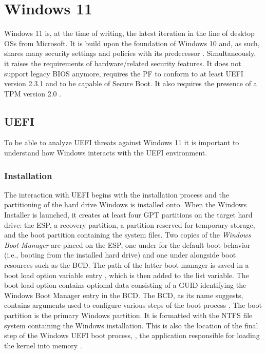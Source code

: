 

\chapter{Windows 11}
\label{sec:windows}

Windows 11 is, at the time of writing, the latest iteration in the line of desktop \acp{OS} from Microsoft.
It is build upon the foundation of Windows 10 and, as such, shares many security settings and policies with its predecessor \cite{microsoft-windows-11-overview}.
Simultaneously, it raises the requirements of hardware\-/related security features.
It does not support legacy \ac{BIOS} anymore, requires the \ac{PF} to conform to at least \ac{UEFI} version 2.3.1 and to be capable of Secure Boot.
It also requires the presence of a \ac{TPM} version 2.0 \cite{microsoft-windows-minimum-hardware-requirements-overview}.

\section{\acs{UEFI}}

To be able to analyze \ac{UEFI} threats against Windows 11 it is important to understand how Windows interacts with the \ac{UEFI} environment.

\subsection{Installation}

The interaction with \ac{UEFI} begins with the installation process and the partitioning of the hard drive Windows is installed onto.
When the Windows Installer is launched, it creates at least four \ac{GPT} partitions on the target hard drive: the \acf{ESP}, a recovery partition, a partition reserved for temporary storage, and the boot partition containing the system files.
Two copies of the \emph{Windows Boot Manager}  are placed on the \ac{ESP}, one under  for the default boot behavior (i.e., booting from the installed hard drive) and one under  alongside boot resources such as the \ac{BCD}.
The path of the latter boot manager is saved in a boot load option variable entry , which is then added to the  list variable.
The boot load option contains optional data consisting of a \ac{GUID} identifying the Windows Boot Manager entry in the \ac{BCD}.
The \ac{BCD}, as its name suggests, contains arguments used to configure various steps of the boot process \cite[Section 12]{windows-internals-7-part2}.
The boot partition is the primary Windows partition.
It is formatted with the \ac{NTFS} file system containing the Windows installation.
This is also the location of the final step of the Windows \ac{UEFI} boot process, , the application responsible for loading the kernel into memory \cite[12. The Windows OS Loader]{windows-internals-7-part2}.

